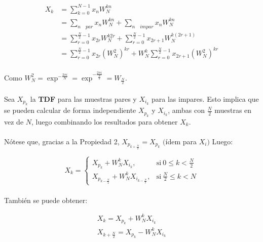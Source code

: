 \documentclass[12pt, twocolumn]{article}
\begin{document}
	\begin{align}
		X_{k} &= \sum_{k=0}^{N-1} x_{n}W_{N}^{kn} \\
		&= \sum_{n\quad par}x_{n}W_{N}^{kn} + \sum_{n\quad impar}x_{n}W_{N}^{kn} \\
		&= \sum_{r=0}^{\frac{N}{2}-1} x_{2r}W_{N}^{k2r} + \sum_{r=0}^{\frac{N}{2}-1}x_{2r+1}W_{N}^{k(2r+1)} \\
		&= \sum_{r=0}^{\frac{N}{2}-1}x_{2r}(W_{N}^{2})^{kr} + W_{N}^{k}\sum_{r=0}^{\frac{N}{2}-1}x_{2r+1}(W_{N}^{2})^{kr}
	\end{align}
	
	\paragraph{} Como $W_{N}^{2} = \exp^{-\frac{2\pi i}{N}} = \exp^{-\frac{2\pi i}{\frac{N}{2}}} = W_{\frac{N}{2}}$.
	
	\paragraph{} Sea $X_{p_{k}}$ la \textbf{TDF} para las muestras pares y $X_{i_{k}}$ para las impares. Esto implica que se pueden calcular de forma independiente $X_{p_{k}}$ y $X_{i_{k}}$, ambas con $\frac{N}{2}$ muestras en vez de $N$, luego combinando los resultados para obtener $X_{k}$.
	
	\paragraph{} Nótese que, gracias a la Propiedad 2, $X_{p_{k+\frac{N}{2}}} = X_{p_{k}}$ $($ídem para $X_{i})$ Luego:
	
	\begin{equation}
	X_{k}=
	\begin{cases}
	X_{p_{k}}+W_{N}^{k}X_{i_{k}}, & \text{si}\ 0\le k< \frac{N}{2} \\
	X_{p_{k-\frac{N}{2}}}+W_{N}^{k}X_{i_{k-\frac{N}{2}}}, & \text{si}\ \frac{N}{2}\le k < N
	\end{cases}
	\end{equation}
	
	\paragraph{} También se puede obtener:
	
	\begin{align*}
		X_{k} = X_{p_{k}} + W_{N}^{k}X_{i_{k}} \\
		X_{k+\frac{N}{2}} = X_{p_{k}} - W_{N}^{k}X_{i_{k}}
	\end{align*}
	
\end{document}
